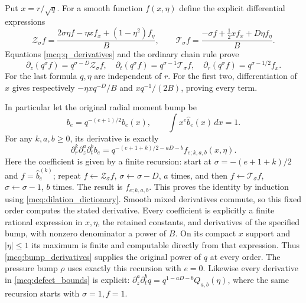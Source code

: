 Put \(x=r/\sqrt q\). For a smooth function \(f(x,\eta)\) define the
explicit differential expressions
\[
 \mathcal Z_\sigma f=
 \frac{2\sigma\eta f-\eta x f_x+(1-\eta^2)f_\eta}{B},\qquad
 \mathcal T_\sigma f=
 \frac{-\sigma f+\frac12x f_x+D\eta f_\eta}{B}.
\]
Equations \eqref{mcq:q_derivatives} and the ordinary chain rule prove
\begin{equation}\label{mcq:dilation_dictionary}
 \partial_z(q^\sigma f)=q^{\sigma-D}\mathcal Z_\sigma f,\quad
 \partial_t(q^\sigma f)=q^{\sigma-1}\mathcal T_\sigma f,\quad
 \partial_r(q^\sigma f)=q^{\sigma-1/2}f_x .
\end{equation}
For the last formula \(q,\eta\) are independent of \(r\).
For the first two, differentiation of \(x\) gives respectively
\(-\eta xq^{-D}/B\) and \(xq^{-1}/(2B)\), proving every term.

In particular let the original radial moment bump be
\[
 b_e=q^{-(e+1)/2}\widehat b_e(x),\qquad
 \int x^e\widehat b_e(x)\,dx=1 .
\]
For any \(k,a,b\ge0\), its derivative is exactly
\begin{equation}\label{mcq:bump_derivatives}
 \partial_r^k\partial_z^a\partial_t^b b_e
 =q^{-(e+1+k)/2-aD-b} f_{e;k,a,b}(x,\eta).
\end{equation}
Here the coefficient is given by a finite recursion: start at
\(\sigma=-(e+1+k)/2\) and \(f=\widehat b_e^{(k)}\);
repeat \(f\leftarrow\mathcal Z_\sigma f\),
\(\sigma\leftarrow\sigma-D\), \(a\) times, and then
\(f\leftarrow\mathcal T_\sigma f\),
\(\sigma\leftarrow\sigma-1\), \(b\) times.
The result is \(f_{e;k,a,b}\). This proves the identity by induction
using \eqref{mcq:dilation_dictionary}. Smooth mixed derivatives commute,
so this fixed order computes the stated derivative.
Every coefficient is explicitly a finite rational expression in \(x,\eta\),
the retained constants, and derivatives of the specified bump, with
nonzero denominator a power of \(B\). On its compact \(x\) support
and \(|\eta|\le1\) its maximum is finite and computable directly from
that expression. Thus \eqref{mcq:bump_derivatives} supplies the original
power of \(q\) at every order.
The pressure bump \(\rho\) uses exactly this recursion with \(e=0\).
Likewise every derivative in \eqref{mcq:defect_bounds} is explicit:
\(\partial_z^a\partial_t^bq=q^{1-aD-b}Q_{a,b}(\eta)\), where the same
recursion starts with \(\sigma=1,f=1\).


